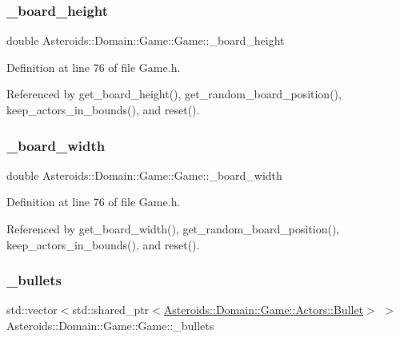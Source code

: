 \subsubsection{\texorpdfstring{\+\_\+board\+\_\+height}{\_board\_height}}
{\footnotesize\ttfamily double Asteroids\+::\+Domain\+::\+Game\+::\+Game\+::\+\_\+board\+\_\+height\hspace{0.3cm}{\ttfamily [private]}}



Definition at line 76 of file Game.\+h.



Referenced by get\+\_\+board\+\_\+height(), get\+\_\+random\+\_\+board\+\_\+position(), keep\+\_\+actors\+\_\+in\+\_\+bounds(), and reset().

\mbox{\label{classAsteroids_1_1Domain_1_1Game_1_1Game_a6fea71dec73c6a984ac38a0abd76dd47}} 
\subsubsection{\texorpdfstring{\+\_\+board\+\_\+width}{\_board\_width}}
{\footnotesize\ttfamily double Asteroids\+::\+Domain\+::\+Game\+::\+Game\+::\+\_\+board\+\_\+width\hspace{0.3cm}{\ttfamily [private]}}



Definition at line 76 of file Game.\+h.



Referenced by get\+\_\+board\+\_\+width(), get\+\_\+random\+\_\+board\+\_\+position(), keep\+\_\+actors\+\_\+in\+\_\+bounds(), and reset().

\mbox{\label{classAsteroids_1_1Domain_1_1Game_1_1Game_a9972c0063c33e27012ed2aaf8bc18ca7}} 
\subsubsection{\texorpdfstring{\+\_\+bullets}{\_bullets}}
{\footnotesize\ttfamily std\+::vector$<$std\+::shared\+\_\+ptr$<$\hyperlink{classAsteroids_1_1Domain_1_1Game_1_1Actors_1_1Bullet}{Asteroids\+::\+Domain\+::\+Game\+::\+Actors\+::\+Bullet}$>$ $>$ Asteroids\+::\+Domain\+::\+Game\+::\+Game\+::\+\_\+bullets\hspace{0.3cm}{\ttfamily [private]}}



